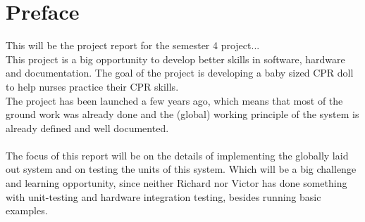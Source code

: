 \chapter*{Preface}

This will be the project report for the semester 4 project...\\
This project is a big opportunity to develop better skills in software, hardware and documentation. The goal of the project is developing a baby sized CPR doll to help nurses practice their CPR skills.\\ The project has been launched a few years ago, which means that most of the ground work was already done and the (global) working principle of the system is already defined and well documented. \\\\The focus of this report will be on the details of implementing the globally laid out system and on testing the units of this system. Which will be a big challenge and learning opportunity, since neither Richard nor Victor has done something with unit-testing and hardware integration testing, besides running basic examples. 